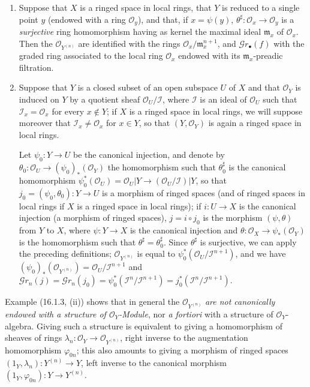 \begin{examples}[16.1.3]
\label{IV.16.1.3}
\begin{enumerate}
\item[(i)] Suppose that $X$ is a ringed space in local rings, that $Y$ is
reduced to a single point $y$ (endowed with a ring $\mathcal{O}_y$), and that, if
$x=\psi(y)$, $\theta^\sharp:\mathcal{O}_x\to\mathcal{O}_y$ is a \emph{surjective}
ring homomorphism having as kernel the maximal ideal $\mathfrak{m}_x$ of
$\mathcal{O}_x$. Then the $\mathcal{O}_{Y^{(n)}}$ are identified with the rings
$\mathcal{O}_x/\mathfrak{m}_x^{n+1}$, and $\mathscr{G}r_\bullet(f)$ with the graded
ring associated to the local ring $\mathcal{O}_x$ endowed with its
$\mathfrak{m}_x$-preadic filtration.
\item[(ii)] Suppose that $Y$ is a closed subset of an open subspace $U$
of $X$ and that $\mathcal{O}_Y$ is induced on $Y$ by a quotient sheaf
$\mathcal{O}_U/\mathscr{I}$, where $\mathscr{I}$ is an ideal of $\mathcal{O}_U$
such that $\mathscr{I}_x=\mathcal{O}_x$ for every $x\notin Y$; if $X$ is a
ringed space in local rings, we will suppose moreover that
$\mathscr{I}_x\neq\mathcal{O}_x$ for $x\in Y$, so that
$(Y,\mathcal{O}_Y)$ is again a ringed space in local rings.

Let $\psi_0:Y\to U$ be the canonical injection, and denote by
$\theta_0:\mathcal{O}_U\to(\psi_0)_*(\mathcal{O}_Y)$ the homomorphism such that
$\theta_0^\sharp$ is the canonical homomorphism
$\psi_0^*(\mathcal{O}_U)=\mathcal{O}_U|Y\to
(\mathcal{O}_U/\mathscr{I})|Y$, so that
$j_0=(\psi_0,\theta_0):Y\to U$ is a morphism of ringed spaces (and of ringed
spaces in local rings if $X$ is a ringed space in local rings); if
$i:U\to X$ is the canonical injection (a morphism of ringed spaces),
$j=i\circ j_0$ is the morphism $(\psi,\theta)$ from $Y$ to $X$, where
$\psi:Y\to X$ is the canonical injection and
$\theta:\mathcal{O}_X\to\psi_*(\mathcal{O}_Y)$ is the homomorphism such that
$\theta^\sharp=\theta_0^\sharp$. Since $\theta^\sharp$ is surjective, we can apply the
preceding definitions; $\mathcal{O}_{Y^{(n)}}$ is equal to
$\psi_0^*(\mathcal{O}_U/\mathscr{I}^{n+1})$, and we have
$(\psi_0)_*(\mathcal{O}_{Y^{(n)}})=\mathcal{O}_U/\mathscr{I}^{n+1}$ and
$\mathscr{G}r_n(j)=\mathscr{G}r_n(j_0)=
\psi_0^*(\mathscr{I}^n/\mathscr{I}^{n+1})=
j_0^*(\mathscr{I}^n/\mathscr{I}^{n+1})$.
\end{enumerate}
\end{examples}

\begin{env}[16.1.4]
\label{IV.16.1.4}
Example (16.1.3, (ii)) shows that in general the
$\mathcal{O}_{Y^{(n)}}$ \emph{are not canonically endowed with a structure of
$\mathcal{O}_Y$-Module}, nor \emph{a fortiori} with a structure of
$\mathcal{O}_Y$-algebra. Giving such a structure is equivalent to giving a
homomorphism of sheaves of rings
$\lambda_n:\mathcal{O}_Y\to\mathcal{O}_{Y^{(n)}}$, right inverse to
the augmentation homomorphism $\varphi_{0n}$; this also amounts to giving
a morphism of ringed spaces
$(1_Y,\lambda_n):Y^{(n)}\to Y$, left inverse to the canonical morphism
$(1_Y,\varphi_{0n}):Y\to Y^{(n)}$.
\end{env}

